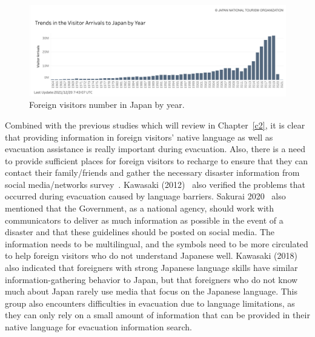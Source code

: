 \begin{figure}[h]
  \includegraphics[width=\linewidth]{Figure/Figure1.png}
  \centering
  \caption[Foreign visitors number in Japan by year.]{Foreign visitors number in Japan by year.\protect\footnotemark }
  \label{fig1}
\end{figure}
Combined with the previous studies which will review in Chapter~\ref{c2}, it is clear that providing information in foreign visitors' native language as well as evacuation assistance is really important during evacuation. Also, there is a need to provide sufficient places for foreign visitors to recharge to ensure that they can contact their family/friends and gather the necessary disaster information from social media/networks survey~\cite{ref50}. Kawasaki (2012)~\cite{ref48} also verified the problems that occurred during evacuation caused by language barriers. Sakurai 2020~\cite{ref46} also mentioned that the Government, as a national agency, should work with communicators to deliver as much information as possible in the event of a disaster and that these guidelines should be posted on social media. The information needs to be multilingual, and the symbols need to be more circulated to help foreign visitors who do not understand Japanese well. Kawasaki (2018)~\cite{ref47} also indicated that foreigners with strong Japanese language skills have similar information-gathering behavior to Japan, but that foreigners who do not know much about Japan rarely use media that focus on the Japanese language. This group also encounters difficulties in evacuation due to language limitations, as they can only rely on a small amount of information that can be provided in their native language for evacuation information search.


